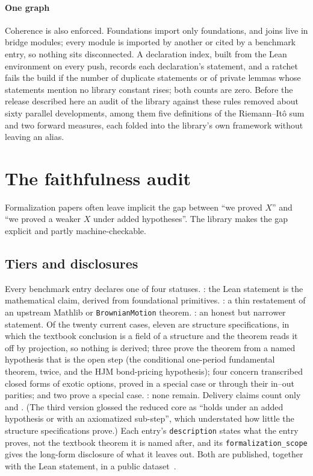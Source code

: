 \documentclass[11pt]{article}
\begin{document}
\paragraph{One graph}
Coherence is also enforced. Foundations import only foundations, and joins live in bridge modules; every module is
imported by another or cited by a benchmark entry, so nothing sits disconnected. A declaration index, built from the Lean
environment on every push, records each declaration's statement, and a ratchet fails the build if the number of duplicate
statements or of private lemmas whose statements mention no library constant rises; both counts are zero. Before the
release described here an audit of the library against these rules removed about sixty parallel developments, among them
five definitions of the Riemann--It\^o sum and two forward measures, each folded into the library's own framework without
leaving an alias.

\section{The faithfulness audit}\label{sec:audit}

Formalization papers often leave implicit the gap between ``we proved $X$'' and ``we proved a weaker $X$ under added
hypotheses''. The library makes the gap explicit and partly machine-checkable.

\subsection{Tiers and disclosures}
Every benchmark entry declares one of four statuses. : the Lean statement is the mathematical claim, derived
from foundational primitives. : a thin restatement of an upstream Mathlib or \texttt{BrownianMotion}
theorem. : an honest but narrower statement. Of the twenty current cases, eleven are structure
specifications, in which the textbook conclusion is a field of a structure and the theorem reads it off by projection, so
nothing is derived; three prove the theorem from a named hypothesis that is the open step (the conditional one-period
fundamental theorem, twice, and the HJM bond-pricing hypothesis); four concern transcribed closed forms of exotic options,
proved in a special case or through their in--out parities; and two prove a special case. : none
remain. Delivery claims count only  and . (The third version glossed the reduced
core as ``holds under an added hypothesis or with an axiomatized sub-step'', which understated how little the structure
specifications prove.) Each entry's \texttt{description} states what the entry proves, not the textbook theorem it is named
after, and its \texttt{formalization\_scope} gives the long-form disclosure of what it leaves out. Both are published,
together with the Lean statement, in a public dataset~\cite{HFDataset}.
\end{document}
